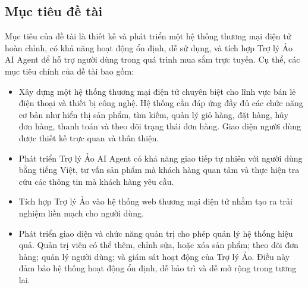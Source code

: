 \subsection{Mục tiêu đề tài}
Mục tiêu của đề tài là thiết kế và phát triển một hệ thống thương mại điện tử hoàn chỉnh, có khả năng hoạt động ổn định, dễ sử dụng, và tích hợp Trợ lý Ảo AI Agent để hỗ trợ người dùng trong quá trình mua sắm trực tuyến.
Cụ thể, các mục tiêu chính của đề tài bao gồm:

\begin{itemize}
    \item Xây dựng một hệ thống thương mại điện tử chuyên biệt cho lĩnh vực bán lẻ điện thoại và thiết bị công nghệ. Hệ thống cần đáp ứng đầy đủ các chức năng cơ bản như hiển thị sản phẩm, tìm kiếm, quản lý giỏ hàng, đặt hàng, hủy đơn hàng, thanh toán và theo dõi trạng thái đơn hàng. Giao diện người dùng được thiết kế trực quan và thân thiện.
    \item Phát triển Trợ lý Ảo AI Agent có khả năng giao tiếp tự nhiên với người dùng bằng tiếng Việt, tư vấn sản phẩm mà khách hàng quan tâm và thực hiện tra cứu các thông tin mà khách hàng yêu cầu.
    \item Tích hợp Trợ lý Ảo vào hệ thống web thương mại điện tử nhằm tạo ra trải nghiệm liền mạch cho người dùng.
    \item Phát triển giao diện và chức năng quản trị cho phép quản lý hệ thống hiệu quả. Quản trị viên có thể thêm, chỉnh sửa, hoặc xóa sản phẩm; theo dõi đơn hàng; quản lý người dùng; và giám sát hoạt động của Trợ lý Ảo. Điều này đảm bảo hệ thống hoạt động ổn định, dễ bảo trì và dễ mở rộng trong tương lai.
\end{itemize}
